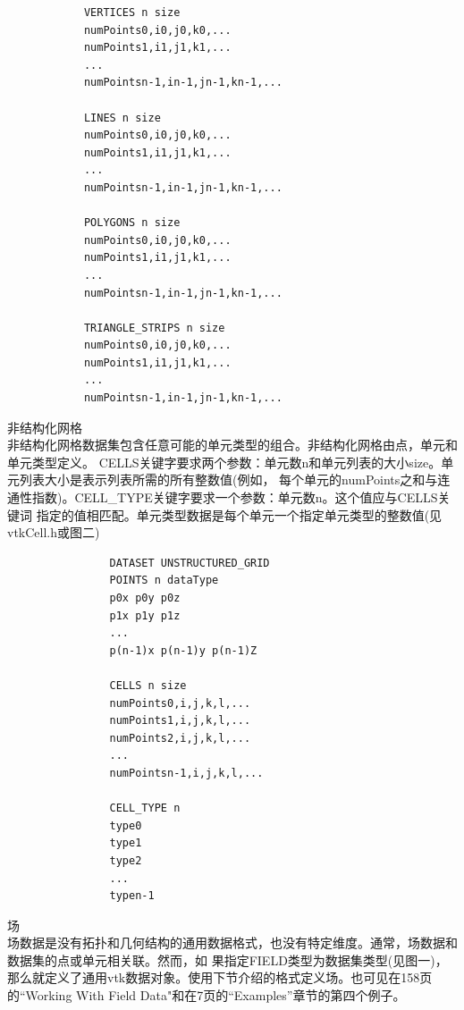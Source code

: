 \documentclass[UTF8]{ctexart}
\begin{document}
\begin{itemize}
{\begin{verbatim}
            VERTICES n size
            numPoints0,i0,j0,k0,...
            numPoints1,i1,j1,k1,... 
            ... 
            numPointsn-1,in-1,jn-1,kn-1,... 

            LINES n size 
            numPoints0,i0,j0,k0,...
            numPoints1,i1,j1,k1,... 
            ... 
            numPointsn-1,in-1,jn-1,kn-1,...

            POLYGONS n size 
            numPoints0,i0,j0,k0,...
            numPoints1,i1,j1,k1,... 
            ... 
            numPointsn-1,in-1,jn-1,kn-1,...

            TRIANGLE_STRIPS n size 
            numPoints0,i0,j0,k0,...
            numPoints1,i1,j1,k1,... 
            ... 
            numPointsn-1,in-1,jn-1,kn-1,...
        \end{verbatim}
        \item {
            非结构化网格 \\
            非结构化网格数据集包含任意可能的单元类型的组合。非结构化网格由点，单元和单元类型定义。
            CELLS关键字要求两个参数：单元数n和单元列表的大小size。单元列表大小是表示列表所需的所有整数值(例如，
            每个单元的numPoints之和与连通性指数)。CELL\_TYPE关键字要求一个参数：单元数n。这个值应与CELLS关键词
            指定的值相匹配。单元类型数据是每个单元一个指定单元类型的整数值(见vtkCell.h或图二)
            \begin{verbatim}
                DATASET UNSTRUCTURED_GRID
                POINTS n dataType
                p0x p0y p0z
                p1x p1y p1z
                ...
                p(n-1)x p(n-1)y p(n-1)Z

                CELLS n size
                numPoints0,i,j,k,l,... 
                numPoints1,i,j,k,l,...
                numPoints2,i,j,k,l,... 
                ... 
                numPointsn-1,i,j,k,l,... 

                CELL_TYPE n
                type0
                type1
                type2
                ... 
                typen-1
            \end{verbatim}
        }
        \item{
            场 \\
            场数据是没有拓扑和几何结构的通用数据格式，也没有特定维度。通常，场数据和数据集的点或单元相关联。然而，如
            果指定FIELD类型为数据集类型(见图一)，那么就定义了通用vtk数据对象。使用下节介绍的格式定义场。也可见在158页的“Working
            With Field Data"和在7页的“Examples”章节的第四个例子。
        }
    }
\end{itemize}
\end{document}
